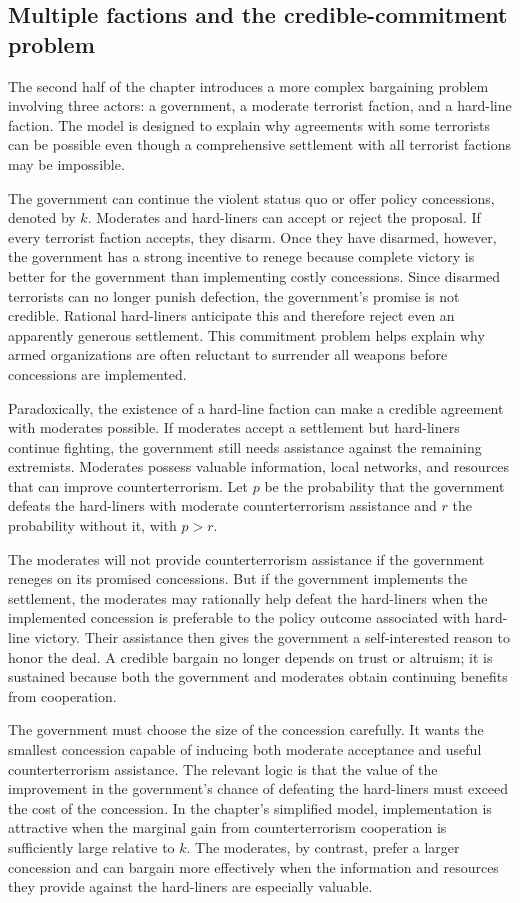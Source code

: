 \subsection{Multiple factions and the credible-commitment problem}

The second half of the chapter introduces a more complex bargaining problem involving three actors: a government, a moderate terrorist faction, and a hard-line faction. The model is designed to explain why agreements with some terrorists can be possible even though a comprehensive settlement with all terrorist factions may be impossible.

The government can continue the violent status quo or offer policy concessions, denoted by $k$. Moderates and hard-liners can accept or reject the proposal. If every terrorist faction accepts, they disarm. Once they have disarmed, however, the government has a strong incentive to renege because complete victory is better for the government than implementing costly concessions. Since disarmed terrorists can no longer punish defection, the government's promise is not credible. Rational hard-liners anticipate this and therefore reject even an apparently generous settlement. This commitment problem helps explain why armed organizations are often reluctant to surrender all weapons before concessions are implemented.

Paradoxically, the existence of a hard-line faction can make a credible agreement with moderates possible. If moderates accept a settlement but hard-liners continue fighting, the government still needs assistance against the remaining extremists. Moderates possess valuable information, local networks, and resources that can improve counterterrorism. Let $p$ be the probability that the government defeats the hard-liners with moderate counterterrorism assistance and $r$ the probability without it, with $p>r$.

The moderates will not provide counterterrorism assistance if the government reneges on its promised concessions. But if the government implements the settlement, the moderates may rationally help defeat the hard-liners when the implemented concession is preferable to the policy outcome associated with hard-line victory. Their assistance then gives the government a self-interested reason to honor the deal. A credible bargain no longer depends on trust or altruism; it is sustained because both the government and moderates obtain continuing benefits from cooperation.

The government must choose the size of the concession carefully. It wants the smallest concession capable of inducing both moderate acceptance and useful counterterrorism assistance. The relevant logic is that the value of the improvement in the government's chance of defeating the hard-liners must exceed the cost of the concession. In the chapter's simplified model, implementation is attractive when the marginal gain from counterterrorism cooperation is sufficiently large relative to $k$. The moderates, by contrast, prefer a larger concession and can bargain more effectively when the information and resources they provide against the hard-liners are especially valuable.

